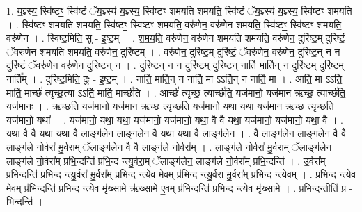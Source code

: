 \documentclass[17pt]{extarticle}
\begin{document}
1. य॒ज्ञ्स्य॒ स्वि॑ष्टꣳ॒॒ स्वि॑ष्टं ॅय॒ज्ञ्स्य॑ य॒ज्ञ्स्य॒ स्वि॑ष्टꣳ शमयति शमयति॒ स्वि॑ष्टं ॅय॒ज्ञ्स्य॑ य॒ज्ञ्स्य॒ स्वि॑ष्टꣳ शमयति । . स्वि॑ष्टꣳ शमयति शमयति॒ स्वि॑ष्टꣳ॒॒ स्वि॑ष्टꣳ शमयति॒ वरु॑णेन॒ वरु॑णेन शमयति॒ स्वि॑ष्टꣳ॒॒ स्वि॑ष्टꣳ शमयति॒ वरु॑णेन । . स्वि॑ष्ट॒मिति॒ सु - इ॒ष्ट॒म् । . श॒म॒य॒ति॒ वरु॑णेन॒ वरु॑णेन शमयति शमयति॒ वरु॑णेन॒ दुरि॑ष्ट॒म् दुरि॑ष्टं॒ ॅवरु॑णेन शमयति शमयति॒ वरु॑णेन॒ दुरि॑ष्टम् । . वरु॑णेन॒ दुरि॑ष्ट॒म् दुरि॑ष्टं॒ ॅवरु॑णेन॒ वरु॑णेन॒ दुरि॑ष्ट॒न् न न दुरि॑ष्टं॒ ॅवरु॑णेन॒ वरु॑णेन॒ दुरि॑ष्ट॒न् न । . दुरि॑ष्ट॒न् न न दुरि॑ष्ट॒म् दुरि॑ष्ट॒न् नार्ति॒ मार्ति॒न् न दुरि॑ष्ट॒म् दुरि॑ष्ट॒म् नार्ति᳚म् । . दुरि॑ष्ट॒मिति॒ दुः - इ॒ष्ट॒म् । . नार्ति॒ मार्ति॒न् न नार्ति॒ मा ऽऽर्ति॒न् न नार्ति॒ मा । . आर्ति॒ मा ऽऽर्ति॒ मार्ति॒ मार्च्छ॑ त्यृच्छ॒त्या ऽऽर्ति॒ मार्ति॒ मार्च्छ॑ति । . आर्च्छ॑ त्यृच्छ॒ त्यार्च्छ॑ति॒ यज॑मानो॒ यज॑मान ऋच्छ॒ त्यार्च्छ॑ति॒ यज॑मानः । . ऋ॒च्छ॒ति॒ यज॑मानो॒ यज॑मान ऋच्छ त्यृच्छति॒ यज॑मानो॒ यथा॒ यथा॒ यज॑मान ऋच्छ त्यृच्छति॒ यज॑मानो॒ यथा᳚ । . यज॑मानो॒ यथा॒ यथा॒ यज॑मानो॒ यज॑मानो॒ यथा॒ वै वै यथा॒ यज॑मानो॒ यज॑मानो॒ यथा॒ वै । . यथा॒ वै वै यथा॒ यथा॒ वै लाङ्ग॑लेन॒ लाङ्ग॑लेन॒ वै यथा॒ यथा॒ वै लाङ्ग॑लेन । . वै लाङ्ग॑लेन॒ लाङ्ग॑लेन॒ वै वै लाङ्ग॑ले नो॒र्वरा॑ मु॒र्वरा॒म् ॅलाङ्ग॑लेन॒ वै वै लाङ्ग॑ले नो॒र्वरा᳚म् । . लाङ्ग॑ले नो॒र्वरा॑ मु॒र्वरा॒म् ॅलाङ्ग॑लेन॒ लाङ्ग॑ले नो॒र्वरा᳚म् प्रभि॒न्दन्ति॑ प्रभि॒न्द न्त्यु॒र्वरा॒म् ॅलाङ्ग॑लेन॒ लाङ्ग॑ले नो॒र्वरा᳚म् प्रभि॒न्दन्ति॑ । . उ॒र्वरा᳚म् प्रभि॒न्दन्ति॑ प्रभि॒न्द न्त्यु॒र्वरा॑ मु॒र्वरा᳚म् प्रभि॒न्द न्त्ये॒व मे॒वम् प्र॑भि॒न्द न्त्यु॒र्वरा॑ मु॒र्वरा᳚म् प्रभि॒न्द न्त्ये॒वम् । . प्र॒भि॒न्द न्त्ये॒व मे॒वम् प्र॑भि॒न्दन्ति॑ प्रभि॒न्द न्त्ये॒व मृ॑ख्सा॒मे ऋ॑ख्सा॒मे ए॒वम् प्र॑भि॒न्दन्ति॑ प्रभि॒न्द
न्त्ये॒व मृ॑ख्सा॒मे । . प्र॒भि॒न्दन्तीति॑ प्र - भि॒न्दन्ति॑ । \newline
\end{document}
